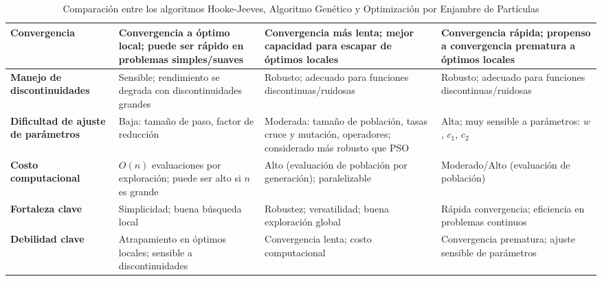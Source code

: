 \begin{table}[h!]
\begin{tabularx}{\textwidth}{X|X|X|X}
        \textbf{Convergencia} & Convergencia a óptimo local; puede ser rápido en problemas simples/suaves & Convergencia más lenta; mejor capacidad para escapar de óptimos locales & Convergencia rápida; propenso a convergencia prematura a óptimos locales \\
        \hline
        \rowcolor{cw2!70!white}
        \textbf{Manejo de discontinuidades} & Sensible; rendimiento se degrada con discontinuidades grandes & Robusto; adecuado para funciones discontinuas/ruidosas & Robusto; adecuado para funciones discontinuas/ruidosas \\
        \hline
        \rowcolor{cw1!30!white}
        \textbf{Dificultad de ajuste de parámetros} & Baja: tamaño de paso, factor de reducción & Moderada: tamaño de población, tasas cruce y mutación, operadores; considerado más robusto que PSO & Alta; muy sensible a parámetros: $w$, $c_1$, $c_2$ \\
        \hline
        \rowcolor{cw2!70!white}
        \textbf{Costo computacional} & $O(n)$ evaluaciones por exploración; puede ser alto si $n$ es grande & Alto (evaluación de población por generación); paralelizable & Moderado/Alto (evaluación de población) \\
        \hline
        \rowcolor{cw1!30!white}
        \textbf{Fortaleza clave} & Simplicidad; buena búsqueda local & Robustez; versatilidad; buena exploración global & Rápida convergencia; eficiencia en problemas continuos \\
        \hline
        \rowcolor{cw2!70!white}
        \textbf{Debilidad clave} & Atrapamiento en óptimos locales; sensible a discontinuidades & Convergencia lenta; costo computacional & Convergencia prematura; ajuste sensible de parámetros
    \end{tabularx}
    \caption{Comparación entre los algoritmos Hooke-Jeeves, Algoritmo Genético y Optimización por Enjambre de Partículas}
\end{table}